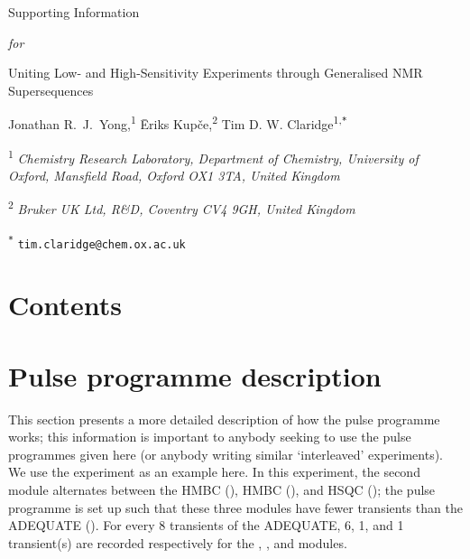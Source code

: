 \documentclass[a4paper,12pt]{article}
\newcommand{\me}{Jonathan R.\ J.\ Yong}
\newcommand{\eriks}{{\=E}riks Kup{\v{c}}e}
\newcommand{\tim}{Tim D. W. Claridge}
\newcommand{\articletitle}{\todo{Uniting Low- and High-Sensitivity Experiments through Generalised NMR Supersequences}}
\newcommand{\crl}{Chemistry Research Laboratory, Department of Chemistry, University of Oxford, Mansfield Road, Oxford OX1 3TA, United Kingdom}
\newcommand{\brukeruk}{Bruker UK Ltd, R\&D, Coventry CV4 9GH, United Kingdom}
\newcommand{\carbon}{\ch{^{13}C}}
\newcommand{\nitrogen}{\ch{^{15}N}}
\newcommand{\todo}[1]{{\color{OrangeRed}#1}}
\begin{document}
\clearpage
\begin{refsection}
\newcommand{\sectionbreak}{\clearpage}
\renewcommand*{\thefigure}{S\arabic{figure}}
\renewcommand*{\thesection}{S\arabic{section}}
\renewcommand*{\thetable}{S\arabic{table}}
\renewcommand*{\thepage}{S\arabic{page}}
\setcounter{page}{1}
\setcounter{figure}{0}
\setcounter{section}{0}
\setcounter{table}{0}
\onehalfspacing

\hspace{0pt}
\vfill
\begin{center}
    \huge
    Supporting Information

    \vspace{0.3cm}

    \textit{for}

    \vspace{0.3cm}

    \articletitle{}

    \vspace{0.6cm}

    \Large \me{},\textsuperscript{1} \eriks{},\textsuperscript{2} \tim{}\textsuperscript{1,\texttt{*}}

    \vspace{0.6cm}

    \large \textsuperscript{1} \textit{\crl{}}

    \textsuperscript{2} \textit{\brukeruk{}}

    \textsuperscript{\texttt{*}} \texttt{tim.claridge@chem.ox.ac.uk}

\end{center}

\vspace{2cm}
\section*{Contents}

\startcontents[si]
\vfill
\hspace{0pt}
\newpage

\section{Pulse programme description}
\label{sec:pp_detail}

This section presents a more detailed description of how the pulse programme works; this information is important to anybody seeking to use the pulse programmes given here (or anybody writing similar `interleaved' experiments).
We use the  experiment as an example here.
In this experiment, the second module alternates between the \nitrogen{} HMBC (), \carbon{} HMBC (), and \carbon{} HSQC (); the pulse programme is set up such that these three modules have fewer transients than the ADEQUATE ().
For every 8 transients of the ADEQUATE, 6, 1, and 1 transient(s) are recorded respectively for the , , and  modules.


\end{refsection}
\end{document}
